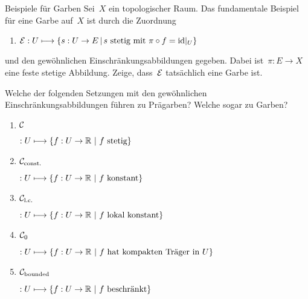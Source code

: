 \documentclass{uebblatt}
\begin{document}

\begin{aufgabe}{Beispiele für Garben}
Sei~$X$ ein topologischer Raum. Das fundamentale Beispiel für eine Garbe
auf~$X$ ist durch die Zuordnung
\begin{enumerate}
\item $\mathcal{E} : U \longmapsto \{ s : U \to E \,|\, \text{$s$ stetig mit $\pi \circ f = \mathrm{id}|_U$} \}$
\end{enumerate}
und den gewöhnlichen Einschränkungsabbildungen gegeben. Dabei ist~$\pi : E \to
X$ eine feste stetige Abbildung. Zeige, dass~$\mathcal{E}$ tatsächlich eine Garbe ist.

Welche der folgenden Setzungen mit den gewöhnlichen Einschränkungsabbildungen
führen zu Prägarben? Welche sogar zu Garben?
\newlength{\sheafname}
\begin{enumerate}
\addtocounter{enumi}{1}
\item \parbox{\sheafname}{$\mathcal{C}$} $: U \longmapsto \{ f : U \to \RR \ |\  \text{$f$ stetig} \}$
\item \parbox{\sheafname}{$\mathcal{C}_\text{const.}$} $ : U \longmapsto \{ f : U \to \RR \ |\  \text{$f$ konstant} \}$
\item \parbox{\sheafname}{$\mathcal{C}_\text{l.c.}$} $ : U \longmapsto \{ f : U \to \RR \ |\  \text{$f$ lokal konstant} \}$
\item \parbox{\sheafname}{$\mathcal{C}_\text{0}$} $ : U \longmapsto \{ f : U \to \mathbb{R} \ |\
\text{$f$ hat kompakten Träger in~$U$} \}$
\item \parbox{\sheafname}{$\mathcal{C}_\text{bounded}$} $ : U \longmapsto \{ f : U \to \RR \ |\  \text{$f$ beschränkt} \}$
\end{enumerate}
\end{aufgabe}
\end{document}
